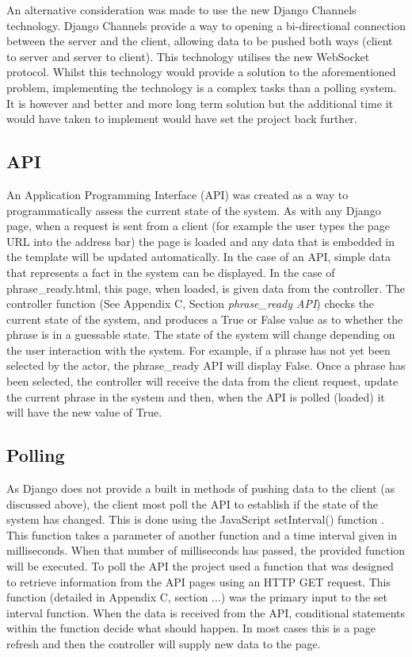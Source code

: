 An alternative consideration was made to use the new Django Channels technology. Django Channels provide a way to opening a bi-directional connection between the server and the client, allowing data to be pushed both ways (client to server and server to client)\cite{django_channels}. This technology utilises the new WebSocket protocol. Whilst this technology would provide a solution to the aforementioned problem, implementing the technology is a complex tasks than a polling system. It is however and better and more long term solution but the additional time it would have taken to implement would have set the project back further.

\subsection{API}
An Application Programming Interface (API) was created as a way to programmatically assess the current state of the system. As with any Django page, when a request is sent from a client (for example the user types the page URL into the address bar) the page is loaded and any data that is embedded in the template will be updated automatically. In the case of an API, simple data that represents a fact in the system can be displayed. In the case of phrase\_ready.html, this page, when loaded, is given data from the controller. The controller function (See Appendix C, Section \textit{phrase\_ready API}) checks the current state of the system, and produces a True or False value as to whether the phrase is in a guessable state. The state of the system will change depending on the user interaction with the system. For example, if a phrase has not yet been selected by the actor, the phrase\_ready API will display False. Once a phrase has been selected, the controller will receive the data from the client request, update the current phrase in the system and then, when the API is polled (loaded) it will have the new value of True.

\subsection{Polling}
As Django does not provide a built in methods of pushing data to the client (as discussed above), the client most poll the API to establish if the state of the system has changed. This is done using the JavaScript setInterval() function \cite{js_setinterval}. This function takes a parameter of another function and a time interval given in milliseconds. When that number of milliseconds has passed, the provided function will be executed. To poll the API the project used a function that was designed to retrieve information from the API pages using an HTTP GET request. This function (detailed in Appendix C, section ...) was the primary input to the set interval function. When the data is received from the API, conditional statements within the function decide what should happen. In most cases this is a page refresh and then the controller will supply new data to the page.

